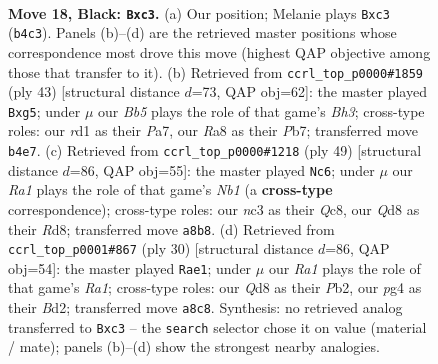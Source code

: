 \documentclass[11pt]{article}
\begin{document}
\clearpage

\begin{figure}[p]\centering
\begin{subfigure}{0.46\textwidth}\centering
\resizebox{\linewidth}{!}{%
\newchessgame
\chessboard[
  setfen={r2q1rk1/p4p1p/4p3/pP1pQ1p1/Pb1P1PP1/2N4P/2P5/2KR3R b - - 2 18},
  showmover=false,
  pgfstyle=straightmove, color=movearrow, markmove={b4-c3}
]}
\caption{}
\end{subfigure}\hfill
\begin{subfigure}{0.46\textwidth}\centering
\resizebox{\linewidth}{!}{%
\newchessgame
\chessboard[
  setfen={1r6/ppp1rpk1/5qpb/P2Qp1Np/BP2P3/2P4P/5PP1/R3R1K1 b - - 0 22},
  showmover=false,
  pgfstyle=straightmove, color=movearrow, markmove={h6-g5}
]}
\caption{}
\end{subfigure}
\\[4pt]
\begin{subfigure}{0.46\textwidth}\centering
\resizebox{\linewidth}{!}{%
\newchessgame
\chessboard[
  setfen={1nqr2k1/pp2b1p1/4r3/2p1p3/2PpQ1Pp/1P1NP2P/P2B1PK1/3R1R2 b - - 4 25},
  showmover=false,
  pgfstyle=straightmove, color=movearrow, markmove={b8-c6}
]}
\caption{}
\end{subfigure}\hfill
\begin{subfigure}{0.46\textwidth}\centering
\resizebox{\linewidth}{!}{%
\newchessgame
\chessboard[
  setfen={2kr3r/ppp2p1p/2npq3/5p2/4P3/2Q2P2/PPPB2PP/R4RK1 w - - 2 16},
  showmover=false,
  pgfstyle=straightmove, color=movearrow, markmove={a1-e1}
]}
\caption{}
\end{subfigure}
\caption{\textbf{Move 18, Black: \texttt{Bxc3}.} (a) Our position; Melanie plays \texttt{Bxc3} (\texttt{b4c3}). Panels (b)--(d) are the retrieved master positions whose correspondence most drove this move (highest QAP objective among those that transfer to it). (b) Retrieved from \texttt{ccrl\_top\_p0000\#1859} (ply 43) [structural distance $d$=73, QAP obj=62]: the master played \texttt{Bxg5}; under $\mu$ our \emph{Bb5} plays the role of that game's \emph{Bh3}; cross-type roles: our \emph{r}d1 as their \emph{P}a7, our \emph{R}a8 as their \emph{P}b7; transferred move \texttt{b4e7}. (c) Retrieved from \texttt{ccrl\_top\_p0000\#1218} (ply 49) [structural distance $d$=86, QAP obj=55]: the master played \texttt{Nc6}; under $\mu$ our \emph{Ra1} plays the role of that game's \emph{Nb1} (a \textbf{cross-type} correspondence); cross-type roles: our \emph{n}c3 as their \emph{Q}c8, our \emph{Q}d8 as their \emph{R}d8; transferred move \texttt{a8b8}. (d) Retrieved from \texttt{ccrl\_top\_p0001\#867} (ply 30) [structural distance $d$=86, QAP obj=54]: the master played \texttt{Rae1}; under $\mu$ our \emph{Ra1} plays the role of that game's \emph{Ra1}; cross-type roles: our \emph{Q}d8 as their \emph{P}b2, our \emph{p}g4 as their \emph{B}d2; transferred move \texttt{a8c8}. Synthesis: no retrieved analog transferred to \texttt{Bxc3} -- the \texttt{search} selector chose it on value (material / mate); panels (b)--(d) show the strongest nearby analogies.}
\label{fig:thought-m35}
\end{figure}
\end{document}
